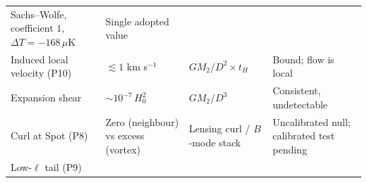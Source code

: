 \documentclass[
]{article}
\begin{document}
\begin{longtable}[]{@{}llll@{}}
\begin{minipage}[t]{0.22\columnwidth}
Sachs--Wolfe, coefficient \(1\), \(\Delta T = -168\,\mu\)K\strut
\end{minipage} & \begin{minipage}[t]{0.22\columnwidth}\raggedright
Single adopted value\strut
\end{minipage}\tabularnewline
\begin{minipage}[t]{0.22\columnwidth}\raggedright
Induced local velocity (P10)\strut
\end{minipage} & \begin{minipage}[t]{0.22\columnwidth}\raggedright
\(\lesssim 1\) km s\(^{-1}\)\strut
\end{minipage} & \begin{minipage}[t]{0.22\columnwidth}\raggedright
\(GM_2/D^2 \times t_H\)\strut
\end{minipage} & \begin{minipage}[t]{0.22\columnwidth}\raggedright
Bound; flow is local\strut
\end{minipage}\tabularnewline
\begin{minipage}[t]{0.22\columnwidth}\raggedright
Expansion shear\strut
\end{minipage} & \begin{minipage}[t]{0.22\columnwidth}\raggedright
\(\sim\!10^{-7}\,H_0^2\)\strut
\end{minipage} & \begin{minipage}[t]{0.22\columnwidth}\raggedright
\(GM_2/D^3\)\strut
\end{minipage} & \begin{minipage}[t]{0.22\columnwidth}\raggedright
Consistent, undetectable\strut
\end{minipage}\tabularnewline
\begin{minipage}[t]{0.22\columnwidth}\raggedright
Curl at Spot (P8)\strut
\end{minipage} & \begin{minipage}[t]{0.22\columnwidth}\raggedright
Zero (neighbour) vs excess (vortex)\strut
\end{minipage} & \begin{minipage}[t]{0.22\columnwidth}\raggedright
Lensing curl / \(B\)-mode stack\strut
\end{minipage} & \begin{minipage}[t]{0.22\columnwidth}\raggedright
Uncalibrated null; calibrated test pending\strut
\end{minipage}\tabularnewline
\begin{minipage}[t]{0.22\columnwidth}\raggedright
Low-\(\ell\) tail (P9)\strut

\end{minipage}
\end{longtable}
\end{document}

